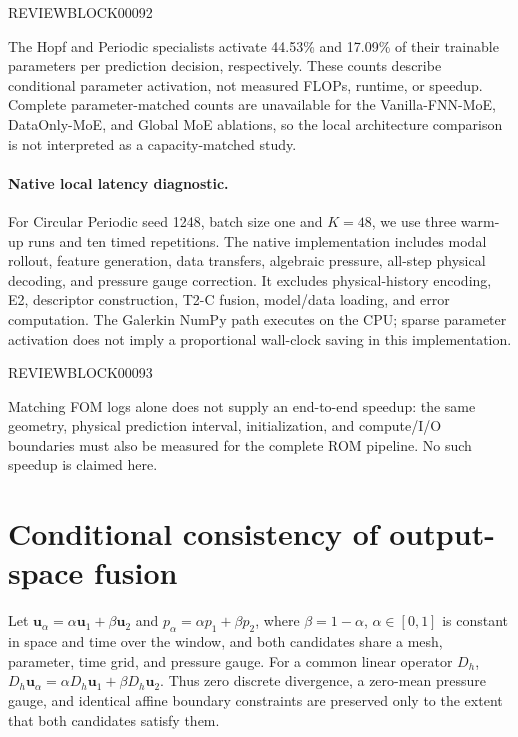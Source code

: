 \documentclass{article}
\begin{document}
\par


REVIEWBLOCK00092


\par

The Hopf and Periodic specialists activate 44.53\% and 17.09\% of their
trainable parameters per prediction decision, respectively. These counts
describe conditional parameter activation, not measured FLOPs, runtime,
or speedup. Complete parameter-matched counts are unavailable for the
Vanilla-FNN-MoE, DataOnly-MoE, and Global MoE ablations, so the local
architecture comparison is not interpreted as a capacity-matched study.

\paragraph{Native local latency diagnostic.}
For Circular Periodic seed 1248, batch size one and $K=48$, we use three
warm-up runs and ten timed repetitions. The native implementation
includes modal rollout, feature generation, data transfers, algebraic
pressure, all-step physical decoding, and pressure gauge correction.
It excludes physical-history encoding, E2, descriptor construction,
T2-C fusion, model/data loading, and error computation. The Galerkin
NumPy path executes on the CPU; sparse parameter activation does not
imply a proportional wall-clock saving in this implementation.



REVIEWBLOCK00093



Matching FOM logs alone does not supply an end-to-end speedup: the same
geometry, physical prediction interval, initialization, and compute/I/O
boundaries must also be measured for the complete ROM pipeline. No such
speedup is claimed here.

\section{Conditional consistency of output-space fusion}
\label{app:fusion_consistency}
Let $\bm u_\alpha=\alpha\bm u_1+\beta\bm u_2$ and $p_\alpha=\alpha p_1+\beta p_2$, where $\beta=1-\alpha$, $\alpha\in[0,1]$ is constant in space and time over the window, and both candidates share a mesh, parameter, time grid, and pressure gauge. For a common linear operator $D_h$, $D_h\bm u_\alpha=\alpha D_h\bm u_1+\beta D_h\bm u_2$. Thus zero discrete divergence, a zero-mean pressure gauge, and identical affine boundary constraints are preserved only to the extent that both candidates satisfy them.
\end{document}
